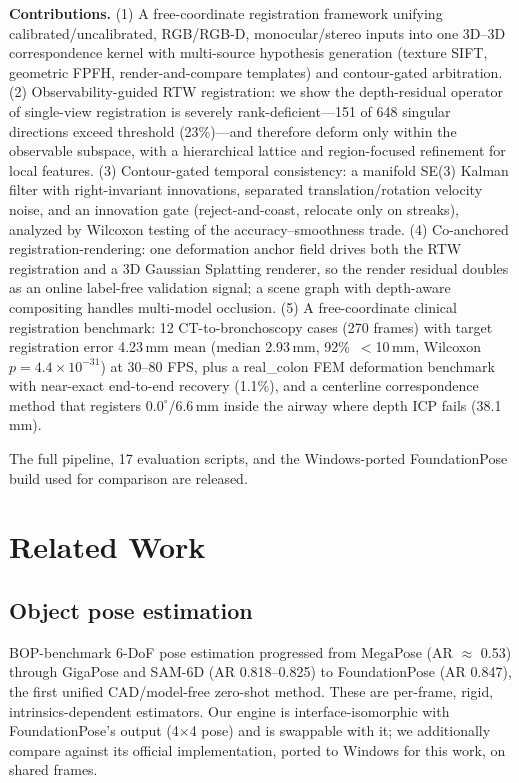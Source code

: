 \documentclass[journal]{IEEEtran}
\begin{document}
\textbf{Contributions.}
(1) A free-coordinate registration framework unifying calibrated/uncalibrated, RGB/RGB-D, monocular/stereo inputs into one 3D--3D correspondence kernel with multi-source hypothesis generation (texture SIFT, geometric FPFH, render-and-compare templates) and contour-gated arbitration.
(2) Observability-guided RTW registration: we show the depth-residual operator of single-view registration is severely rank-deficient---151 of 648 singular directions exceed threshold (23\%)---and therefore deform only within the observable subspace, with a hierarchical lattice and region-focused refinement for local features.
(3) Contour-gated temporal consistency: a manifold SE(3) Kalman filter with right-invariant innovations, separated translation/rotation velocity noise, and an innovation gate (reject-and-coast, relocate only on streaks), analyzed by Wilcoxon testing of the accuracy--smoothness trade.
(4) Co-anchored registration-rendering: one deformation anchor field drives both the RTW registration and a 3D Gaussian Splatting renderer, so the render residual doubles as an online label-free validation signal; a scene graph with depth-aware compositing handles multi-model occlusion.
(5) A free-coordinate clinical registration benchmark: 12 CT-to-bronchoscopy cases (270 frames) with target registration error 4.23\,mm mean (median 2.93\,mm, 92\%\ $<$10\,mm, Wilcoxon $p=4.4\times10^{-31}$) at 30--80 FPS, plus a real\_colon FEM deformation benchmark with near-exact end-to-end recovery (1.1\%), and a centerline correspondence method that registers $0.0^{\circ}$/6.6\,mm inside the airway where depth ICP fails (38.1\,mm).

The full pipeline, 17 evaluation scripts, and the Windows-ported FoundationPose build used for comparison are released.

\section{Related Work}
\subsection{Object pose estimation}
BOP-benchmark 6-DoF pose estimation progressed from MegaPose (AR $\approx$ 0.53) through GigaPose and SAM-6D (AR 0.818--0.825) to FoundationPose (AR 0.847), the first unified CAD/model-free zero-shot method. These are per-frame, rigid, intrinsics-dependent estimators. Our engine is interface-isomorphic with FoundationPose's output (4$\times$4 pose) and is swappable with it; we additionally compare against its official implementation, ported to Windows for this work, on shared frames.
\end{document}
